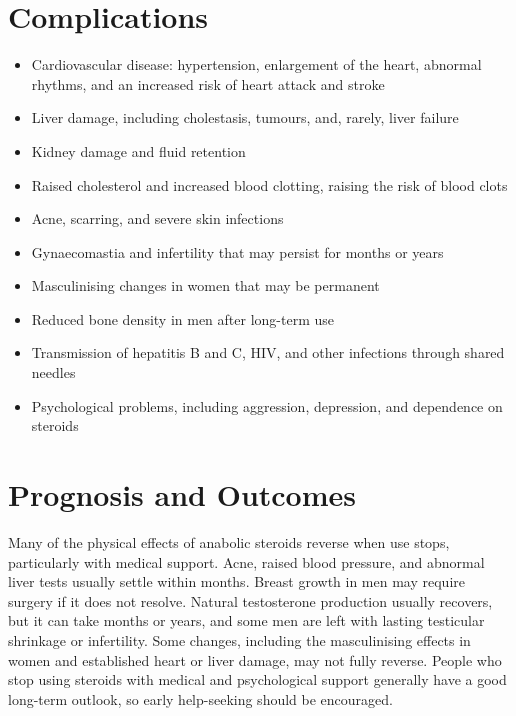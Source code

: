 \section*{Complications}
\begin{itemize}
    \item Cardiovascular disease: hypertension, enlargement of the heart, abnormal rhythms, and an increased risk of heart attack and stroke
    \item Liver damage, including cholestasis, tumours, and, rarely, liver failure
    \item Kidney damage and fluid retention
    \item Raised cholesterol and increased blood clotting, raising the risk of blood clots
    \item Acne, scarring, and severe skin infections
    \item Gynaecomastia and infertility that may persist for months or years
    \item Masculinising changes in women that may be permanent
    \item Reduced bone density in men after long-term use
    \item Transmission of hepatitis B and C, HIV, and other infections through shared needles
    \item Psychological problems, including aggression, depression, and dependence on steroids
\end{itemize}

\section*{Prognosis and Outcomes}
Many of the physical effects of anabolic steroids reverse when use stops, particularly with medical support. Acne, raised blood pressure, and abnormal liver tests usually settle within months. Breast growth in men may require surgery if it does not resolve. Natural testosterone production usually recovers, but it can take months or years, and some men are left with lasting testicular shrinkage or infertility. Some changes, including the masculinising effects in women and established heart or liver damage, may not fully reverse. People who stop using steroids with medical and psychological support generally have a good long-term outlook, so early help-seeking should be encouraged.

